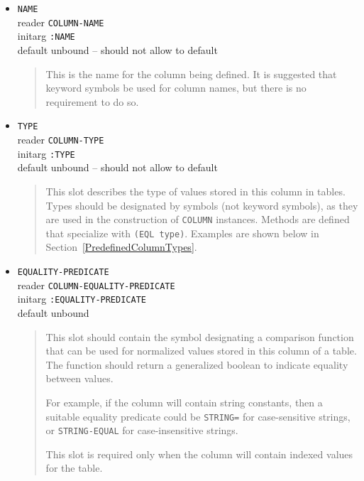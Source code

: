 \documentclass[article,oneside]{memoir}
\begin{document}
\begin{itemize}

\item \texttt{NAME} \\ 
reader \texttt{COLUMN-NAME} \\ 
initarg \texttt{:NAME} \\
default unbound -- should not allow to default

\begin{quote}
This is the name for the column being defined. It is suggested that keyword symbols be used for column names, but there is no requirement to do so.
\end{quote}

\item \texttt{TYPE} \\ 
reader \texttt{COLUMN-TYPE} \\ 
initarg \texttt{:TYPE} \\
default unbound -- should not allow to default

\begin{quote}
This slot describes the type of values stored in this column in tables. Types should be designated by symbols (not keyword symbols), as they are used in the construction of \texttt{COLUMN} instances. Methods are defined that specialize with \texttt{(EQL type)}. Examples are shown below in Section~\ref{PredefinedColumnTypes}.
\end{quote}

\item \texttt{EQUALITY-PREDICATE} \\ 
reader \texttt{COLUMN-EQUALITY-PREDICATE} \\ 
initarg \texttt{:EQUALITY-PREDICATE} \\ 
default unbound

\begin{quote}
This slot should contain the symbol designating a comparison function that can be used for normalized values stored in this column of a table. The function should return a generalized boolean to indicate equality between values.

For example, if the column will contain string constants, then a suitable equality predicate could be \texttt{STRING=} for case-sensitive strings, or \texttt{STRING-EQUAL} for case-insensitive strings.

This slot is required only when the column will contain indexed values for the table.
\end{quote}


\end{itemize}
\end{document}
